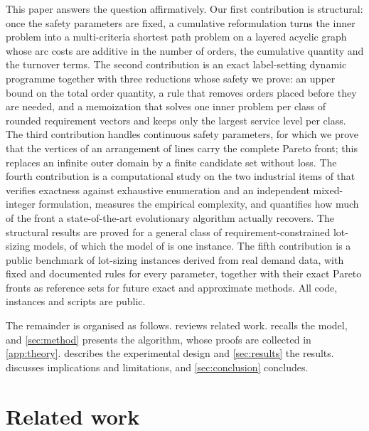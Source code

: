 \documentclass[preprint,12pt,authoryear]{elsarticle}
\begin{document}
This paper answers the question affirmatively. Our first contribution is structural:
once the safety parameters are fixed, a cumulative reformulation turns the inner problem
into a multi-criteria shortest path problem on a layered acyclic graph whose arc costs
are additive in the number of orders, the cumulative quantity and the turnover terms. The
second contribution is an exact label-setting dynamic programme together with three
reductions whose safety we prove: an upper bound on the total order quantity, a rule that
removes orders placed before they are needed, and a memoization that solves one inner
problem per class of rounded requirement vectors and keeps only the largest service
level per class. The third contribution handles continuous safety parameters, for which
we prove that the vertices of an arrangement of lines carry the complete Pareto front;
this replaces an infinite outer domain by a finite candidate set without loss. The fourth
contribution is a computational study on the two industrial items of \citet{Kania2022CIE}
that verifies exactness against exhaustive enumeration and an independent mixed-integer
formulation, measures the empirical complexity, and quantifies how much of the front a
state-of-the-art evolutionary algorithm actually recovers. The structural results are proved for a general class of requirement-constrained
lot-sizing models, of which the model of \citet{Kania2022CIE} is one instance. The fifth contribution is a
public benchmark of lot-sizing instances derived from real demand data, with fixed and
documented rules for every parameter, together with their exact Pareto fronts as reference
sets for future exact and approximate methods. All code, instances and scripts are public.

The remainder is organised as follows.  reviews related work.
 recalls the model, and \cref{sec:method} presents the algorithm, whose
proofs are collected in \cref{app:theory}.  describes the experimental
design and \cref{sec:results} the results.  discusses implications
and limitations, and \cref{sec:conclusion} concludes.

\section{Related work}\label{sec:related}
\end{document}
